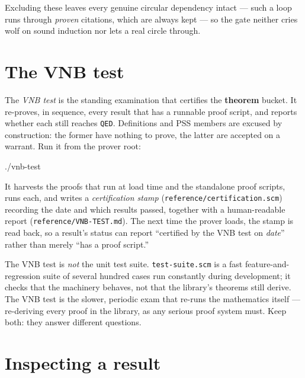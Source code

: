 \noindent
Excluding these leaves every genuine circular dependency intact --- such a loop
runs through \emph{proven} citations, which are always kept --- so the gate
neither cries wolf on sound induction nor lets a real circle through.

\section{The VNB test}
\label{sec:vnb-test}

The \emph{VNB test} is the standing examination that certifies the
\textbf{theorem} bucket.  It re-proves, in sequence, every result that has
a runnable proof script, and reports whether each still reaches
\texttt{QED}.  Definitions and PSS members are excused by construction:
the former have nothing to prove, the latter are accepted on a warrant.
Run it from the prover root:

\begin{VNBsnip}
./vnb-test
\end{VNBsnip}

\noindent
It harvests the proofs that run at load time and the standalone proof
scripts, runs each, and writes a \emph{certification stamp}
(\texttt{reference/certification.scm}) recording the date and which results
passed, together with a human-readable report
(\texttt{reference/VNB-TEST.md}).  The next time the prover loads, the
stamp is read back, so a result's status can report ``certified by the VNB
test on \textit{date}'' rather than merely ``has a proof script.''

\begin{remark}
The VNB test is \emph{not} the unit test suite.
\texttt{test-suite.scm} is a fast feature-and-regression suite of several
hundred cases run constantly during development; it checks that the
machinery behaves, not that the library's theorems still derive.  The VNB
test is the slower, periodic exam that re-runs the mathematics
itself --- re-deriving every proof in the library, as any serious proof
system must.  Keep both: they answer different questions.
\end{remark}

\section{Inspecting a result}
\label{sec:status-query}

